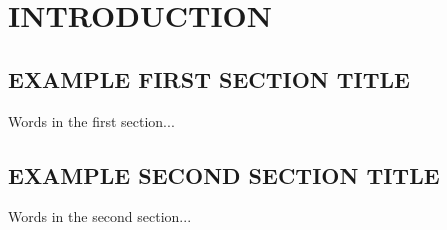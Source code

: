 \chapter{INTRODUCTION}

\section{EXAMPLE FIRST SECTION TITLE}

Words in the first section... \par

\section{EXAMPLE SECOND SECTION TITLE}

Words in the second section... \par

\pagebreak
